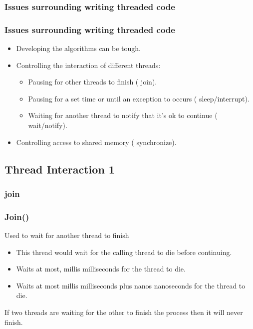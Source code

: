 \documentclass{beamer}
\begin{document}

\subsubsection{Issues surrounding writing threaded code}
\begin{frame}
\frametitle{Issues surrounding writing threaded code}

\begin{itemize}
\item Developing the algorithms can be tough.
\item Controlling the interaction of different threads:
\begin{itemize}
\item Pausing for other threads to finish ({\color{purple} join}).
\item Pausing for a set time or until an exception to occurs ({\color{orange} sleep/interrupt}).
\item Waiting for another thread to notify that it's ok to continue ({\color{magenta} wait/notify}).
\end{itemize}
\item Controlling access to shared memory ({\color{brown} synchronize}).

\end{itemize}
\end{frame}
\subsection{Thread Interaction 1}
\subsubsection{join}
\begin{frame}[fragile]
\frametitle{Join()}
\Large{Used to wait for another thread to finish}
\join
\begin{itemize}
\item This thread would wait for the calling thread to die before continuing.
\joinTwo
\item Waits at most, millis milliseconds for the thread to die.
\joinThree
\item Waits at most millis milliseconds plus nanos nanoseconds for the thread to die.
\end{itemize}
If two threads are waiting for the other to finish the process then it will never finish.
\end{frame}
\end{document}
